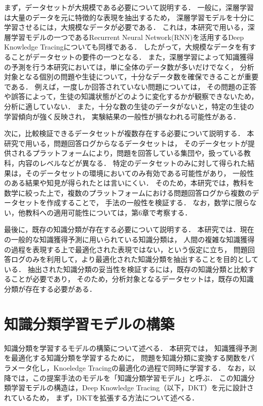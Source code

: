 まず，データセットが大規模である必要について説明する．
一般に，深層学習は大量のデータを元に特徴的な表現を抽出するため，
深層学習モデルを十分に学習させるには，大規模なデータが必要である．
これは，本研究で用いる，深層学習モデルの一つであるRecurrent Neural Network(RNN)を活用するDeep Knowledge Tracingについても同様である\cite{piech2015deep}．
したがって，大規模なデータを有することがデータセットの要件の一つとなる．
また，深層学習によって知識獲得の予測を行う本研究においては，単に全体のデータ数が多いだけでなく，
分析対象となる個別の問題や生徒について，十分なデータ数を確保できることが重要である．
例えば，一度しか回答されていない問題については，
その問題の正答や誤答によって，生徒の知識状態がどのように変化するかが観察できないため，分析に適していない．
また，十分な数の生徒のデータがないと，特定の生徒の学習傾向が強く反映され，
実験結果の一般性が損なわれる可能性がある．


次に，比較検証できるデータセットが複数存在する必要について説明する．
本研究で用いる，問題回答ログからなるデータセットは，
そのデータセットが提供されるプラットフォームにより，問題を回答している集団や，扱っている教科，内容のレベルなどが異なる．
特定のデータセットのみに対して得られた結果は，そのデータセットの環境においてのみ有効である可能性があり，
一般性のある結果や知見が得られたとは言いにくい．
そのため，本研究では，教科を数学に絞った上で，複数のプラットフォームにおける問題回答ログから複数のデータセットを作成することで，
手法の一般性を検証する．
なお，数学に限らない，他教科への適用可能性については，第6章で考察する．


最後に，既存の知識分類が存在する必要について説明する．
本研究では．現在の一般的な知識獲得予測に用いられている知識分類は，
人間の複雑な知識獲得の過程を表現する上で最適化された表現ではない，という仮定に立ち，
問題回答ログのみを利用して，より最適化された知識分類を抽出することを目的としている．
抽出された知識分類の妥当性を検証するには，既存の知識分類と比較することが必要であり，
そのため，分析対象となるデータセットは，既存の知識分類が存在する必要がある．





\section{知識分類学習モデルの構築}
知識分類を学習するモデルの構築について述べる．
本研究では，
知識獲得予測を最適化する知識分類を学習するために，
問題を知識分類に変換する関数をパラメータ化し，Knoeledge Tracingの最適化の過程で同時に学習する．
なお，以降では，この提案手法のモデルを「知識分類学習モデル」と呼ぶ．
この知識分類学習モデルの構造は，Deep Knowledge Tracing（以下，DKT）を元に設計されているため，
まず，DKTを拡張する方法について述べる．

